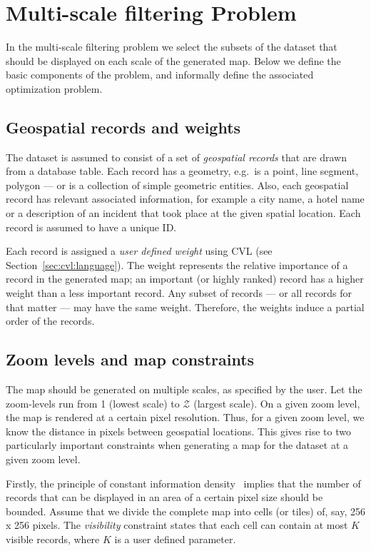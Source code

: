 \section{Multi-scale filtering Problem}
\label{sec:background}

In the multi-scale filtering problem we select the subsets of the dataset that should be displayed on each scale of the generated map. Below we define the basic components of the problem, and informally define the associated optimization problem. 

\subsection{Geospatial records and weights}
\label{sec:records}

The dataset is assumed to consist of a set of \emph{geospatial records} that are drawn from a database table. Each record has a geometry, e.g.\ is a point, line segment, polygon --- or is a collection of simple geometric entities. Also, each geospatial record has relevant associated information, for example a city name, a hotel name or a description of an incident that took place at the given spatial location. Each record is assumed to have a unique ID.

Each record is assigned a \emph{user defined weight} using CVL (see Section~\ref{sec:cvl:language}). The weight represents the relative importance of a record in the generated map; an important (or highly ranked) record has a higher weight than a less important record. Any subset of records --- or all records for that matter --- may have the same weight. Therefore, the weights induce a partial order of the records.

\subsection{Zoom levels and map constraints}
\label{sec:zoomlevels}

The map should be generated on multiple scales, as specified by the user. Let the zoom-levels run from 1 (lowest scale) to $\mathcal{Z}$ (largest scale). On a given zoom level, the map is rendered at a certain pixel resolution. Thus, for a given zoom level, we know the distance in pixels between geospatial locations. This gives rise to two particularly important constraints when generating a map for the dataset at a given zoom level.

Firstly, the principle of constant information density~\cite{topfer1966principles} implies that the number of records that can be displayed in an area of a certain pixel size should be bounded. Assume that we divide the complete map into cells (or tiles) of, say, 256 x 256 pixels. The \emph{visibility} constraint states that each cell can contain at most $K$ visible records, where $K$ is a user defined parameter.


